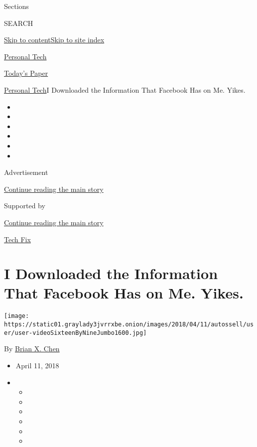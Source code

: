 Sections

SEARCH

\protect\hyperlink{site-content}{Skip to
content}\protect\hyperlink{site-index}{Skip to site index}

\href{https://www.nytimes3xbfgragh.onion/section/technology/personaltech}{Personal
Tech}

\href{https://myaccount.nytimes3xbfgragh.onion/auth/login?response_type=cookie\&client_id=vi}{}

\href{https://www.nytimes3xbfgragh.onion/section/todayspaper}{Today's
Paper}

\href{/section/technology/personaltech}{Personal Tech}\textbar{}I
Downloaded the Information That Facebook Has on Me. Yikes.

\begin{itemize}
\item
\item
\item
\item
\item
\item
\end{itemize}

Advertisement

\protect\hyperlink{after-top}{Continue reading the main story}

Supported by

\protect\hyperlink{after-sponsor}{Continue reading the main story}

\href{/column/tech-fix}{Tech Fix}

\hypertarget{i-downloaded-the-information-that-facebook-has-on-me-yikes}{%
\section{I Downloaded the Information That Facebook Has on Me.
Yikes.}\label{i-downloaded-the-information-that-facebook-has-on-me-yikes}}

\texttt{[image: https://static01.graylady3jvrrxbe.onion/images/2018/04/11/autossell/user/user-videoSixteenByNineJumbo1600.jpg]}

By \href{https://www.nytimes3xbfgragh.onion/by/brian-x-chen}{Brian X.
Chen}

\begin{itemize}
\item
  April 11, 2018
\item
  \begin{itemize}
  \item
  \item
  \item
  \item
  \item
  \item
  \end{itemize}
\end{itemize}

